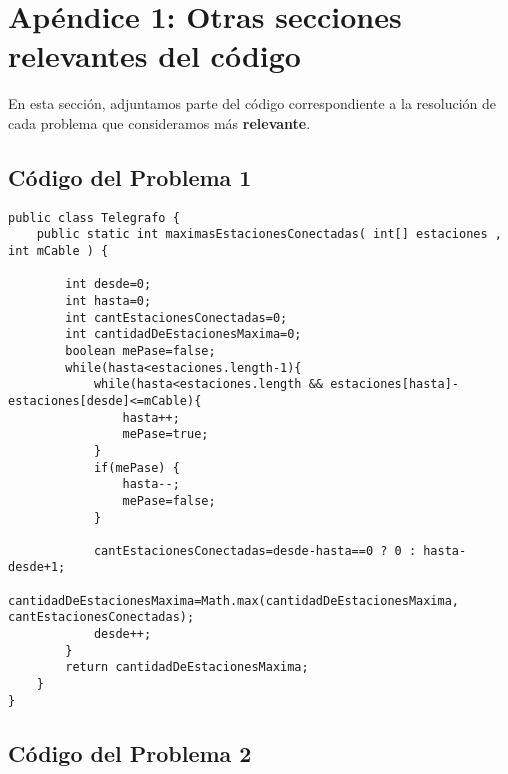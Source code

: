 \documentclass[a4paper]{article}
\begin{document}
\newpage
\section{Apéndice 1: Otras secciones relevantes del código}
En esta sección, adjuntamos parte del código correspondiente a la resolución de cada problema
que consideramos más \textbf{relevante}.

\subsection{Código del Problema 1}

\begin{lstlisting}
public class Telegrafo {
	public static int maximasEstacionesConectadas( int[] estaciones , int mCable ) {
		
		int desde=0;
		int hasta=0;
		int cantEstacionesConectadas=0;
		int cantidadDeEstacionesMaxima=0;
		boolean mePase=false;
		while(hasta<estaciones.length-1){
			while(hasta<estaciones.length && estaciones[hasta]-estaciones[desde]<=mCable){
				hasta++;
				mePase=true;
			}
			if(mePase) {
				hasta--;
				mePase=false;
			}
			
			cantEstacionesConectadas=desde-hasta==0 ? 0 : hasta-desde+1;
			cantidadDeEstacionesMaxima=Math.max(cantidadDeEstacionesMaxima, cantEstacionesConectadas);
			desde++;
		}
		return cantidadDeEstacionesMaxima;
	}
}
\end{lstlisting}



\newpage
\subsection{Código del Problema 2}
\end{document}
